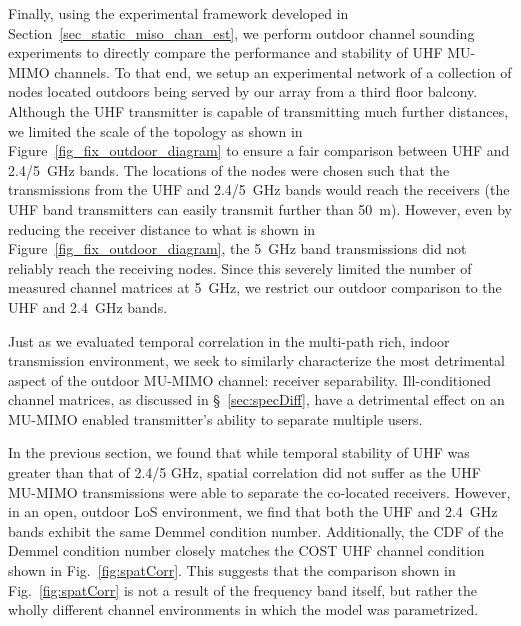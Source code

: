 



	Finally, using the experimental framework developed in Section~\ref{sec_static_miso_chan_est}, we perform outdoor channel sounding experiments to directly compare the performance and stability of UHF \ac{MU-MIMO} channels.
	To that end, we setup an experimental network of a collection of nodes located outdoors being served by our array from a third floor balcony.  
	Although the UHF transmitter is capable of transmitting much further distances, we limited the scale of the topology as shown in Figure~\ref{fig_fix_outdoor_diagram} to ensure a fair comparison between UHF and 2.4/5~GHz bands.   
	The locations of the nodes were chosen such that the transmissions from the UHF and 2.4/5~GHz bands would reach the receivers (the UHF band transmitters can easily transmit further than 50~m).
	However, even by reducing the receiver distance to what is shown in Figure~\ref{fig_fix_outdoor_diagram}, the 5~GHz band transmissions did not reliably reach the receiving nodes.
	Since this severely limited the number of measured channel matrices at 5~GHz, we restrict our outdoor comparison to the UHF and 2.4~GHz bands.

	Just as we evaluated  temporal correlation in the multi-path rich, indoor transmission environment, we seek to similarly characterize the most detrimental aspect of the outdoor MU-MIMO channel: receiver separability.  
	Ill-conditioned channel matrices, as discussed in \S~\ref{sec:specDiff}, have a detrimental effect on an MU-MIMO enabled transmitter's ability to separate multiple users.  

	In the previous section, we found that while temporal stability of UHF was greater than that of 2.4/5 GHz, spatial correlation did not suffer as the UHF MU-MIMO transmissions were able to separate the co-located receivers.
	However, in an open, outdoor \ac{LoS} environment, we find that both the UHF and 2.4~GHz bands exhibit the same Demmel condition number. 
	Additionally, the CDF of the Demmel condition number closely matches the COST UHF channel condition shown in Fig.~\ref{fig:spatCorr}.
	This suggests that the comparison shown in Fig.~\ref{fig:spatCorr} is not a result of the frequency band itself, but rather the wholly different channel environments in which the model was parametrized.

